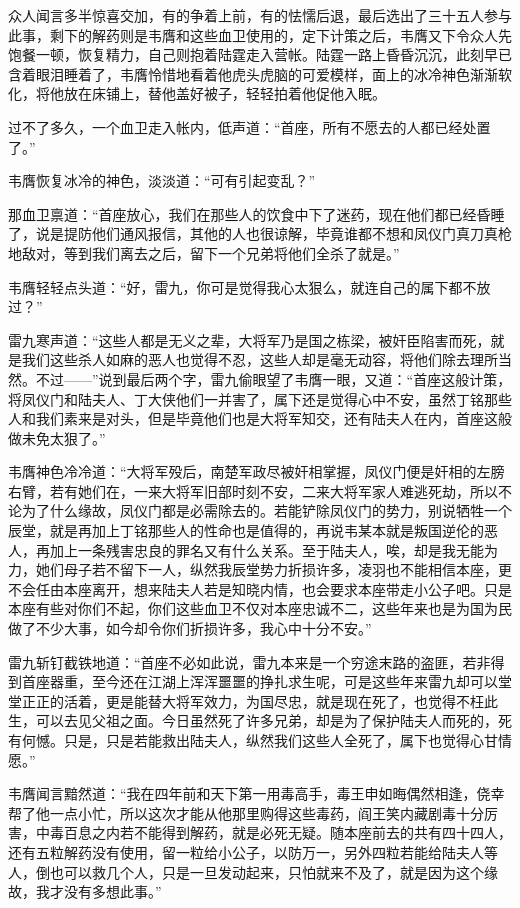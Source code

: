 众人闻言多半惊喜交加，有的争着上前，有的怯懦后退，最后选出了三十五人参与此事，剩下的解药则是韦膺和这些血卫使用的，定下计策之后，韦膺又下令众人先饱餐一顿，恢复精力，自己则抱着陆霆走入营帐。陆霆一路上昏昏沉沉，此刻早已含着眼泪睡着了，韦膺怜惜地看着他虎头虎脑的可爱模样，面上的冰冷神色渐渐软化，将他放在床铺上，替他盖好被子，轻轻拍着他促他入眠。

过不了多久，一个血卫走入帐内，低声道：“首座，所有不愿去的人都已经处置了。”

韦膺恢复冰冷的神色，淡淡道：“可有引起变乱？”

那血卫禀道：“首座放心，我们在那些人的饮食中下了迷药，现在他们都已经昏睡了，说是提防他们通风报信，其他的人也很谅解，毕竟谁都不想和凤仪门真刀真枪地敌对，等到我们离去之后，留下一个兄弟将他们全杀了就是。”

韦膺轻轻点头道：“好，雷九，你可是觉得我心太狠么，就连自己的属下都不放过？”

雷九寒声道：“这些人都是无义之辈，大将军乃是国之栋梁，被奸臣陷害而死，就是我们这些杀人如麻的恶人也觉得不忍，这些人却是毫无动容，将他们除去理所当然。不过——”说到最后两个字，雷九偷眼望了韦膺一眼，又道：“首座这般计策，将凤仪门和陆夫人、丁大侠他们一并害了，属下还是觉得心中不安，虽然丁铭那些人和我们素来是对头，但是毕竟他们也是大将军知交，还有陆夫人在内，首座这般做未免太狠了。”

韦膺神色冷冷道：“大将军殁后，南楚军政尽被奸相掌握，凤仪门便是奸相的左膀右臂，若有她们在，一来大将军旧部时刻不安，二来大将军家人难逃死劫，所以不论为了什么缘故，凤仪门都是必需除去的。若能铲除凤仪门的势力，别说牺牲一个辰堂，就是再加上丁铭那些人的性命也是值得的，再说韦某本就是叛国逆伦的恶人，再加上一条残害忠良的罪名又有什么关系。至于陆夫人，唉，却是我无能为力，她们母子若不留下一人，纵然我辰堂势力折损许多，凌羽也不能相信本座，更不会任由本座离开，想来陆夫人若是知晓内情，也会要求本座带走小公子吧。只是本座有些对你们不起，你们这些血卫不仅对本座忠诚不二，这些年来也是为国为民做了不少大事，如今却令你们折损许多，我心中十分不安。”

雷九斩钉截铁地道：“首座不必如此说，雷九本来是一个穷途末路的盗匪，若非得到首座器重，至今还在江湖上浑浑噩噩的挣扎求生呢，可是这些年来雷九却可以堂堂正正的活着，更是能替大将军效力，为国尽忠，就是现在死了，也觉得不枉此生，可以去见父祖之面。今日虽然死了许多兄弟，却是为了保护陆夫人而死的，死有何憾。只是，只是若能救出陆夫人，纵然我们这些人全死了，属下也觉得心甘情愿。”

韦膺闻言黯然道：“我在四年前和天下第一用毒高手，毒王申如晦偶然相逢，侥幸帮了他一点小忙，所以这次才能从他那里购得这些毒药，阎王笑内藏剧毒十分厉害，中毒百息之内若不能得到解药，就是必死无疑。随本座前去的共有四十四人，还有五粒解药没有使用，留一粒给小公子，以防万一，另外四粒若能给陆夫人等人，倒也可以救几个人，只是一旦发动起来，只怕就来不及了，就是因为这个缘故，我才没有多想此事。”

